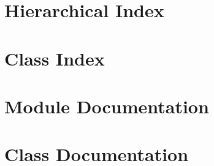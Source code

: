 \documentclass[twoside]{book}
\begin{document}
\chapter{Hierarchical Index}

\chapter{Class Index}

\chapter{Module Documentation}

\chapter{Class Documentation}














\newpage
{}
{}
\printindex
\end{document}
